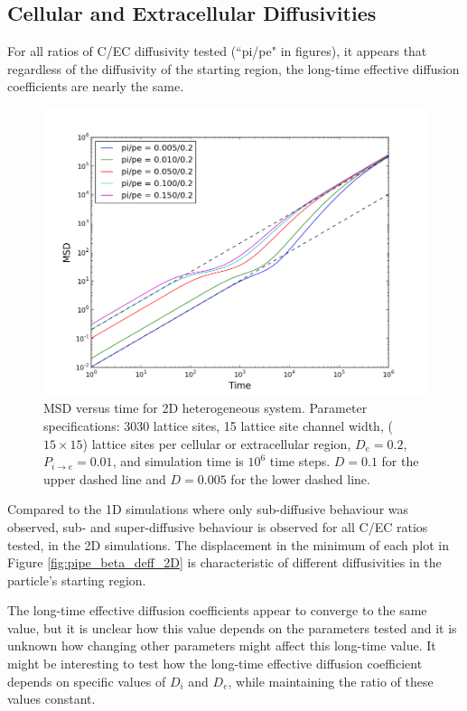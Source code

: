 \clearpage
\subsection{Cellular and Extracellular Diffusivities}
\label{sec:2D-cellular-extracellular-diffusivities}	
	
	For all ratios of C/EC diffusivity tested (``pi/pe" in figures), it appears that regardless of the diffusivity of the starting region, the long-time effective diffusion coefficients are nearly the same.
	
	\begin{figure}[h]
		\centering
		\includegraphics[width=1.0\linewidth]{../images/2D/pipe_msd_2D}
		\caption{MSD versus time for 2D heterogeneous system. Parameter specifications: 3030 lattice sites, 15 lattice site channel width, ($ 15 \times 15 $) lattice sites per cellular or extracellular region, $ D_e = 0.2 $, $ P_{i \rightarrow e} = 0.01 $, and simulation time is $ 10^6 $ time steps. $ D = 0.1 $ for the upper dashed line and $ D = 0.005 $ for the lower dashed line.}
		\label{fig:pipe_msd_2D}
	\end{figure}
	
	Compared to the 1D simulations where only sub-diffusive behaviour was observed, sub- and super-diffusive behaviour is observed for all C/EC ratios tested, in the 2D simulations. The displacement in the minimum of each plot in Figure \ref{fig:pipe_beta_deff_2D} is characteristic of different diffusivities in the particle's starting region.
	
	The long-time effective diffusion coefficients appear to converge to the same value, but it is unclear how this value depends on the parameters tested and it is unknown how changing other parameters might affect this long-time value. It might be interesting to test how the long-time effective diffusion coefficient depends on specific values of $ D_i $ and $ D_e $, while maintaining the ratio of these values constant.
	
